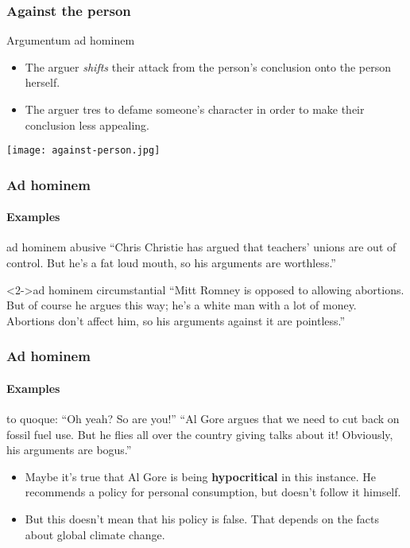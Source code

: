 \documentclass[10pt,letterpaper,xcolor=dvipsnames,handout]{beamer}
\begin{document}
\begin{frame}
  \frametitle{Against the person}
  
  \begin{block}{Argumentum ad hominem}
    \begin{itemize}
      \item The arguer \textit{shifts} their attack from the person's conclusion onto the person herself.
      \item The arguer tres to defame someone's character in order to make their conclusion less appealing.
    \end{itemize}
  \end{block}
  
  \begin{center}
    \texttt{[image: against-person.jpg]}
  \end{center}
  
\end{frame}

\begin{frame}
  \frametitle{Ad hominem}
  \framesubtitle{Examples}
  
  \begin{block}{ad hominem abusive}
    ``Chris Christie has argued that teachers' unions are out of control.  But he's a fat loud mouth, so his arguments are worthless.''
  \end{block}
  
  \begin{block}<2->{ad hominem circumstantial}
    ``Mitt Romney is opposed to allowing abortions.  But of course he argues this way; he's a white man with a lot of money.  Abortions don't affect him, so his arguments against it are pointless.'' 
  \end{block}    

\end{frame}

\begin{frame}
  \frametitle{Ad hominem}
  \framesubtitle{Examples}
  
  \begin{block}{to quoque: ``Oh yeah? So are you!''}
    ``Al Gore argues that we need to cut back on fossil fuel use.  But he flies all over the country giving talks about it!  Obviously, his arguments are bogus.''
  \end{block}
  
  \begin{itemize}
    \item<2-> Maybe it's true that Al Gore is being \textbf{hypocritical} in this instance.  He recommends a policy for personal consumption, but doesn't follow it himself.
    \item<2-> But this doesn't mean that his policy is false.  That depends on the facts about global climate change.
  \end{itemize}
  
\end{frame}
\end{document}
